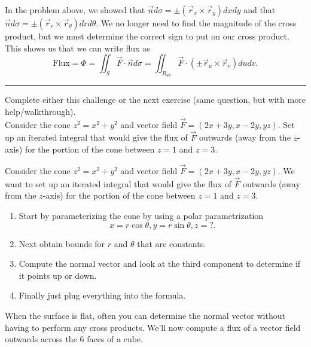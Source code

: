 In the problem above, we showed that $\vec n d\sigma = \pm(\vec r_x\times\vec r_y)dxdy$ and that $\vec n d\sigma = \pm(\vec r_r\times\vec r_\theta)drd\theta$.  We no longer need to find the magnitude of the cross product, but we must determine the correct sign to put on our cross product.  This shows us that we can write flux as 
$$\text{Flux}=\Phi 
= \iint_S \vec F\cdot \vec n d\sigma 
= \iint_{R_{uv}} \vec F\cdot (\pm \vec r_u\times \vec r_v) dudv
.$$

\hrule



\begin{challenge}
Complete either this challenge or the next exercise (same question, but with more help/walkthrough).\\
Consider the cone $z^2=x^2+y^2$ and vector field $\vec F = (2x+3y, x-2y, yz)$. Set up an iterated integral that would give the flux of $\vec F$ outwards (away from the $z$-axis) for the portion of the cone between $z=1$ and $z=3$.
\end{challenge}

\begin{problem}
 Consider the cone $z^2=x^2+y^2$ and vector field $\vec F = (2x+3y, x-2y, yz)$. We want to set up an iterated integral that would give the flux of $\vec F$ outwards (away from the $z$-axis) for the portion of the cone between $z=1$ and $z=3$. 
\begin{enumerate}
	\item Start by  parameterizing the cone by using a polar parametrization $$x=r\cos\theta, y=r\sin\theta, z=?.$$ 
	\item Next obtain bounds for $r$ and $\theta$ that are constants.  
	\item Compute the normal vector and look at the third component to determine if it points up or down.  
	\item Finally just plug everything into the formula.
\end{enumerate}
\end{problem}


When the surface is flat, often you can determine the normal vector without having to perform any cross products.  We'll now compute a flux of a vector field outwards across the 6 faces of a cube. 

